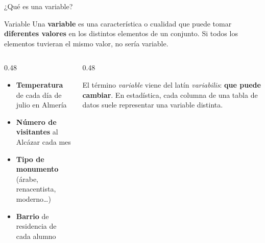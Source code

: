 \documentclass[aspectratio=169, 10pt, spanish]{beamer}
\begin{document}
\begin{frame}[plain]
  \titlepage
\end{frame}

\begin{frame}{¿Qué es una variable?}
  \begin{definicionbox}{Variable}
    Una \textbf{variable} es una característica o cualidad que puede tomar
    \textbf{diferentes valores} en los distintos elementos de un conjunto.
    Si todos los elementos tuvieran el mismo valor, no sería variable.
  \end{definicionbox}

  \vspace{0.4cm}
  \begin{columns}[T]
    \begin{column}{0.48\textwidth}
      \begin{ejemplobox}
        \AlmFontSmall
        \begin{itemize}
          \item \textbf{Temperatura} de cada día de julio en Almería
          \item \textbf{Número de visitantes} al Alcázar cada mes
          \item \textbf{Tipo de monumento} (árabe, renacentista, moderno\ldots)
          \item \textbf{Barrio} de residencia de cada alumno
        \end{itemize}
      \end{ejemplobox}
    \end{column}
    \begin{column}{0.48\textwidth}
      \begin{notabox}
        \AlmFontSmall
        El término \textit{variable} viene del latín \textit{variabilis}:
        \textbf{que puede cambiar}.
        En estadística, cada columna de una tabla de datos
        suele representar una variable distinta.
      \end{notabox}
    \end{column}
  \end{columns}
\end{frame}
\end{document}
